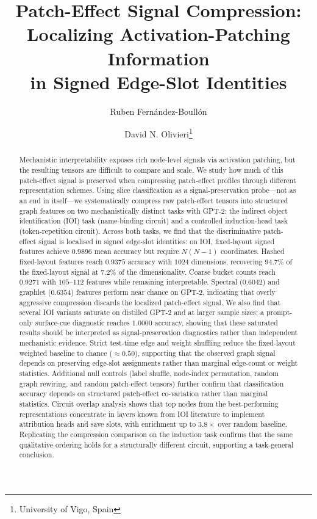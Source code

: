 \documentclass[11pt,a4paper]{article}
\title{Patch-Effect Signal Compression: \\ Localizing Activation-Patching Information \\ in Signed Edge-Slot Identities}
\author{Ruben Fern\'andez-Boull\'on \and David N. Olivieri\thanks{University of Vigo, Spain}}
\begin{document}
\maketitle

\begin{abstract}
Mechanistic interpretability exposes rich node-level signals via activation patching, but the resulting tensors are difficult to compare and scale. We study how much of this patch-effect signal is preserved when compressing patch-effect profiles through different representation schemes. Using slice classification as a signal-preservation probe---not as an end in itself---we systematically compress raw patch-effect tensors into structured graph features on two mechanistically distinct tasks with GPT-2: the indirect object identification (IOI) task (name-binding circuit) and a controlled induction-head task (token-repetition circuit). Across both tasks, we find that the discriminative patch-effect signal is localised in signed edge-slot identities: on IOI, fixed-layout signed features achieve $0.9896$ mean accuracy but require $N(N-1)$ coordinates. Hashed fixed-layout features reach $0.9375$ accuracy with $1024$ dimensions, recovering $94.7\%$ of the fixed-layout signal at $7.2\%$ of the dimensionality. Coarse bucket counts reach $0.9271$ with $105$--$112$ features while remaining interpretable. Spectral ($0.6042$) and graphlet ($0.6354$) features perform near chance on GPT-2, indicating that overly aggressive compression discards the localized patch-effect signal. We also find that several IOI variants saturate on distilled GPT-2 and at larger sample sizes; a prompt-only surface-cue diagnostic reaches $1.0000$ accuracy, showing that these saturated results should be interpreted as signal-preservation diagnostics rather than independent mechanistic evidence. Strict test-time edge and weight shuffling reduce the fixed-layout weighted baseline to chance ($\approx 0.50$), supporting that the observed graph signal depends on preserving edge-slot assignments rather than marginal edge-count or weight statistics. Additional null controls (label shuffle, node-index permutation, random graph rewiring, and random patch-effect tensors) further confirm that classification accuracy depends on structured patch-effect co-variation rather than marginal statistics. Circuit overlap analysis shows that top nodes from the best-performing representations concentrate in layers known from IOI literature to implement attribution heads and save slots, with enrichment up to $3.8\times$ over random baseline. Replicating the compression comparison on the induction task confirms that the same qualitative ordering holds for a structurally different circuit, supporting a task-general conclusion.
\end{abstract}
\end{document}
